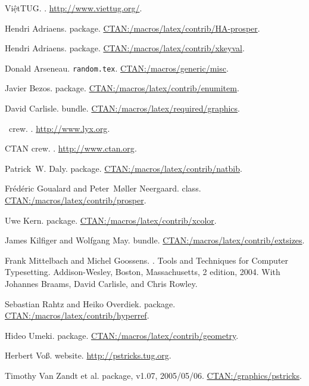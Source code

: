 
\small

\begin{thebibliography}{10}
ViệtTUG.
.
\newblock \url{http://www.viettug.org/}.

Hendri Adriaens.
\newblock {} package.
\newblock \url{CTAN:/macros/latex/contrib/HA-prosper}.

Hendri Adriaens.
\newblock {} package.
\newblock \url{CTAN:/macros/latex/contrib/xkeyval}.

Donald Arseneau.
\newblock \texttt{random.tex}.
\newblock \url{CTAN:/macros/generic/misc}.

Javier Bezos.
\newblock {} package.
\newblock \url{CTAN:/macros/latex/contrib/enumitem}.

David Carlisle.
\newblock {} bundle.
\newblock \url{CTAN:/macros/latex/required/graphics}.

{\LyX\ crew}.
.
\newblock \url{http://www.lyx.org}.

CTAN crew.
.
\newblock \url{http://www.ctan.org}.

Patrick~W. Daly.
\newblock {} package.
\newblock \url{CTAN:/macros/latex/contrib/natbib}.

Fr\'ed\'eric Goualard and Peter~M\o ller Neergaard.
\newblock {} class.
\newblock \url{CTAN:/macros/latex/contrib/prosper}.

Uwe Kern.
\newblock {} package.
\newblock \url{CTAN:/macros/latex/contrib/xcolor}.

James Kilfiger and Wolfgang May.
\newblock {} bundle.
\newblock \url{CTAN:/macros/latex/contrib/extsizes}.

Frank Mittelbach and Michel Goossens.
.
\newblock Tools and Techniques for Computer Typesetting. Addison-Wesley,
  Boston, Massachusetts, 2 edition, 2004.
\newblock With Johannes Braams, David Carlisle, and Chris Rowley.

Sebastian Rahtz and Heiko Overdiek.
\newblock {} package.
\newblock \url{CTAN:/macros/latex/contrib/hyperref}.

Hideo Umeki.
\newblock {} package.
\newblock \url{CTAN:/macros/latex/contrib/geometry}.

Herbert Vo\ss.
\newblock {} website.
\newblock \url{http://pstricks.tug.org}.

{Timothy Van} {Zandt et al.}
\newblock {} package, v1.07, 2005/05/06.
\newblock \url{CTAN:/graphics/pstricks}.
\end{thebibliography}
\endinput
